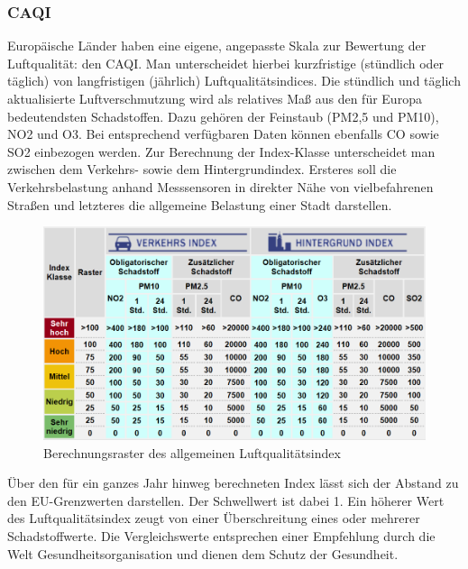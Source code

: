 \subsubsection{\acf{CAQI}}
Europäische Länder haben eine eigene, angepasste Skala zur Bewertung der Luftqualität: den \acf{CAQI}. Man unterscheidet hierbei kurzfristige (stündlich oder täglich) von langfristigen (jährlich) Luftqualitätsindices. 
Die stündlich und täglich aktualisierte Luftverschmutzung wird als relatives Maß aus den für Europa bedeutendsten Schadstoffen. Dazu gehören der Feinstaub (PM2,5 und PM10), \acs{NO2} und \acs{O3}. Bei entsprechend verfügbaren Daten können ebenfalls \acf{CO} sowie \acs{SO2} einbezogen werden. Zur Berechnung der Index-Klasse unterscheidet man zwischen dem Verkehrs- sowie dem Hintergrundindex. Ersteres soll die Verkehrsbelastung anhand Messsensoren in direkter Nähe von vielbefahrenen Straßen und letzteres die allgemeine Belastung einer Stadt darstellen. 
\newline
\begin{figure}[H]
	\centering
	\includegraphics[width=\textwidth]{images/CAQI.png}	
	\caption{Berechnungsraster des allgemeinen Luftqualitätsindex}
	\label{fig:Raster_CAQI}
\end{figure}
Über den für ein ganzes Jahr hinweg berechneten Index lässt sich der Abstand zu den EU-Grenzwerten darstellen. Der Schwellwert ist dabei 1. Ein höherer Wert des Luftqualitätsindex zeugt von einer Überschreitung eines oder mehrerer Schadstoffwerte. Die Vergleichswerte entsprechen einer Empfehlung durch die Welt Gesundheitsorganisation und dienen dem Schutz der Gesundheit. 
\newline

